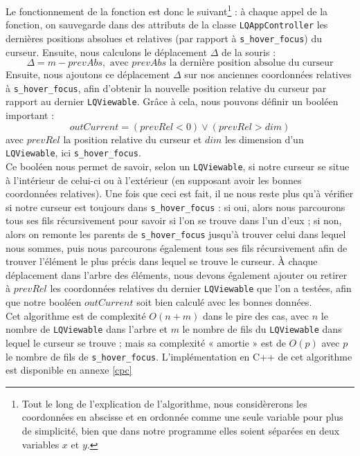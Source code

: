 \documentclass[twoside]{report}
\begin{document}
Le fonctionnement de la fonction est donc le suivant\footnote{Tout le long de l'explication de l'algorithme, nous considèrerons les coordonnées en abscisse et en ordonnée comme une seule variable pour plus de simplicité, bien que dans notre programme elles soient séparées en deux variables $x$ et $y$.} : à chaque appel de la fonction, on sauvegarde dans des attributs de la classe \verb!LQAppController! les dernières positions absolues et relatives (par rapport à \verb!s_hover_focus!) du curseur. Ensuite, nous calculons le déplacement $\Delta$ de la souris :
\[\Delta = m - prevAbs, \text{ avec $prevAbs$ la dernière position absolue du curseur}\]
Ensuite, nous ajoutons ce déplacement $\Delta$ sur nos anciennes coordonnées relatives à \verb!s_hover_focus!, afin d'obtenir la nouvelle position relative du curseur par rapport au dernier \verb!LQViewable!. Grâce à cela, nous pouvons définir un booléen important :
\[outCurrent = (prevRel < 0) \vee (prevRel > dim)\]
avec $prevRel$ la position relative du curseur et $dim$ les dimension d'un \verb!LQViewable!, ici \verb!s_hover_focus!. \\
Ce booléen nous permet de savoir, selon un \verb!LQViewable!, si notre curseur se situe à l'intérieur de celui-ci ou à l'extérieur (en supposant avoir les bonnes coordonnées relatives).
Une fois que ceci est fait, il ne nous reste plus qu'à vérifier si notre curseur est toujours dans \verb!s_hover_focus! : si oui, alors nous parcourons tous ses fils récursivement pour savoir si l'on se trouve dans l'un d'eux ; si non, alors on remonte les parents de \verb!s_hover_focus! jusqu'à trouver celui dans lequel nous sommes, puis nous parcourons également tous ses fils récursivement afin de trouver l'élément le plus précis dans lequel se trouve le curseur. À chaque déplacement dans l'arbre des éléments, nous devons également ajouter ou retirer à $prevRel$ les coordonnées relatives du dernier \verb!LQViewable! que l'on a testées, afin que notre booléen $outCurrent$ soit bien calculé avec les bonnes données. \\
Cet algorithme est de complexité $O(n+m)$ dans le pire des cas, avec $n$ le nombre de \verb!LQViewable! dans l'arbre et $m$ le nombre de fils du \verb!LQViewable! dans lequel le curseur se trouve ; mais sa complexité « amortie » est de $O(p)$ avec $p$ le nombre de fils de \verb!s_hover_focus!. L'implémentation en C++ de cet algorithme est disponible en annexe \ref{cpc}

\newpage
\end{document}
